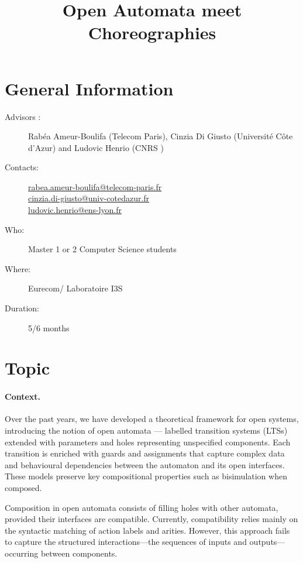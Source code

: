 \documentclass[11pt,a4paper]{article}
\begin{document}
%
\pagestyle{empty}


\title{Open Automata meet Choreographies}



\date{}

\maketitle

\section{General Information }
\begin{description}
\item[Advisors :] Rabéa Ameur-Boulifa (Telecom Paris), Cinzia Di Giusto (Université Côte d'Azur)  and Ludovic Henrio (CNRS )
\item[Contacts: ] \url{rabea.ameur-boulifa@telecom-paris.fr}\\  \url{cinzia.di-giusto@univ-cotedazur.fr}\\ \url{ludovic.henrio@ens-lyon.fr}
\item[Who:] Master 1 or 2 Computer Science students
\item[Where:] Eurecom/ Laboratoire I3S 
\item[Duration:] 5/6 months
\end{description}

\section{Topic}

\paragraph{Context.}


Over the past years, we have developed a theoretical framework for open systems, introducing the notion of open automata  \cite{arxiv-weakbisim,henrio:Forte2016,hou:hal-02406098} — labelled transition systems (LTSs) extended with parameters and holes representing unspecified components. Each transition is enriched with guards and assignments that capture complex data and behavioural dependencies between the automaton and its open interfaces. These models preserve key compositional properties such as bisimulation when composed.

Composition in open automata consists of filling holes with other automata, provided their interfaces are compatible. Currently, compatibility relies mainly on the syntactic matching of action labels and arities. However, this approach fails to capture the structured interactions—the sequences of inputs and outputs—occurring between components.
\end{document}
